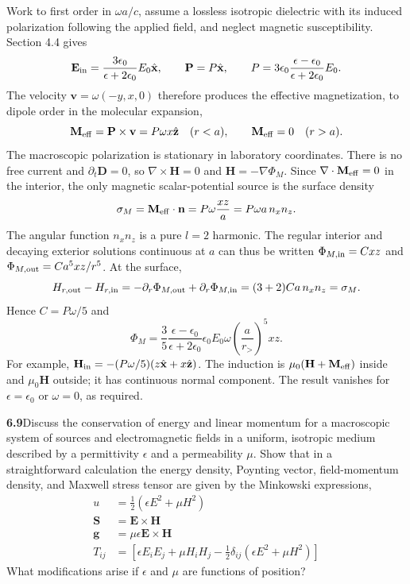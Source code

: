 Work to first order in $\omega a/c$, assume a lossless isotropic dielectric
with its induced polarization following the applied field, and neglect
magnetic susceptibility. Section 4.4 gives
\[
\mathbf E_{\rm in}=\frac{3\epsilon_0}{\epsilon+2\epsilon_0}E_0\hat{\mathbf x},
\qquad \mathbf P=P\hat{\mathbf x},\qquad
P=3\epsilon_0\frac{\epsilon-\epsilon_0}{\epsilon+2\epsilon_0}E_0.
\]
The velocity $\mathbf v=\omega(-y,x,0)$ therefore produces the effective
magnetization, to dipole order in the molecular expansion,
\[
\mathbf M_{\rm eff}=\mathbf P\times\mathbf v=P\omega x\hat{\mathbf z}
\quad(r<a),\qquad \mathbf M_{\rm eff}=0\quad(r>a).
\]
The macroscopic polarization is stationary in laboratory coordinates.
There is no free current and $\partial_t\mathbf D=0$, so
$\nabla\times\mathbf H=0$ and $\mathbf H=-\nabla\Phi_M$.
Since $\nabla\cdot\mathbf M_{\rm eff}=0$ in the interior, the only magnetic
scalar-potential source is the surface density
\[
\sigma_M=\mathbf M_{\rm eff}\cdot\mathbf n
=P\omega\frac{xz}{a}=P\omega a\,n_xn_z.
\]
The angular function $n_xn_z$ is a pure $l=2$ harmonic. The regular
interior and decaying exterior solutions continuous at $a$ can thus be
written $\Phi_{M,\rm in}=C xz$ and
$\Phi_{M,\rm out}=C a^5xz/r^5$. At the surface,
\[
H_{r,\rm out}-H_{r,\rm in}
=-\partial_r\Phi_{M,\rm out}+\partial_r\Phi_{M,\rm in}
=(3+2)Ca\,n_xn_z=\sigma_M.
\]
Hence $C=P\omega/5$ and
\[
\boxed{\Phi_M=\frac35\frac{\epsilon-\epsilon_0}{\epsilon+2\epsilon_0}
\epsilon_0E_0\omega\left(\frac a{r_>}\right)^5xz.}
\]
For example, $\mathbf H_{\rm in}=-(P\omega/5)(z\hat{\mathbf x}+x\hat{\mathbf z})$.
The induction is $\mu_0(\mathbf H+\mathbf M_{\rm eff})$ inside and
$\mu_0\mathbf H$ outside; it has continuous normal component. The result
vanishes for $\epsilon=\epsilon_0$ or $\omega=0$, as required.

\par\bigskip
\noindent\textbf{6.9}\quad Discuss the conservation of energy and linear momentum for a macroscopic system of sources and electromagnetic fields in a uniform, isotropic medium described by a permittivity $\epsilon$ and a permeability $\mu$. Show that in a straightforward calculation the energy density, Poynting vector, field-momentum density, and Maxwell stress tensor are given by the Minkowski expressions,
\begin{align*}
u&=\frac{1}{2}\left(\epsilon E^{2}+\mu H^{2}\right)\\
\mathbf{S}&=\mathbf{E}\times\mathbf{H}\\
\mathbf{g}&=\mu\epsilon\mathbf{E}\times\mathbf{H}\\
T_{ij}&=\left[\epsilon E_{i}E_{j}+\mu H_{i}H_{j}-\tfrac{1}{2}\delta_{ij}(\epsilon E^{2}+\mu H^{2})\right]
\end{align*}
What modifications arise if $\epsilon$ and $\mu$ are functions of position?
\solution

